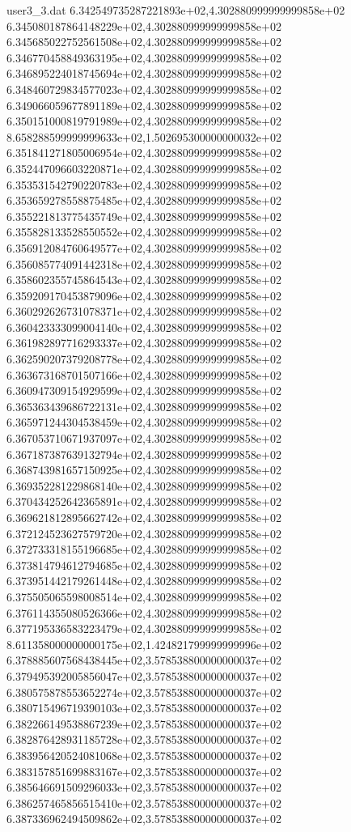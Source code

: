 \begin{filecontents}{user3_3.dat}
6.342549735287221893e+02,4.302880999999999858e+02
6.345080187864148229e+02,4.302880999999999858e+02
6.345685022752561508e+02,4.302880999999999858e+02
6.346770458849363195e+02,4.302880999999999858e+02
6.346895224018745694e+02,4.302880999999999858e+02
6.348460729834577023e+02,4.302880999999999858e+02
6.349066059677891189e+02,4.302880999999999858e+02
6.350151000819791989e+02,4.302880999999999858e+02
8.658288599999999633e+02,1.502695300000000032e+02
6.351841271805006954e+02,4.302880999999999858e+02
6.352447096603220871e+02,4.302880999999999858e+02
6.353531542790220783e+02,4.302880999999999858e+02
6.353659278558875485e+02,4.302880999999999858e+02
6.355221813775435749e+02,4.302880999999999858e+02
6.355828133528550552e+02,4.302880999999999858e+02
6.356912084760649577e+02,4.302880999999999858e+02
6.356085774091442318e+02,4.302880999999999858e+02
6.358602355745864543e+02,4.302880999999999858e+02
6.359209170453879096e+02,4.302880999999999858e+02
6.360292626731078371e+02,4.302880999999999858e+02
6.360423333099004140e+02,4.302880999999999858e+02
6.361982897716293337e+02,4.302880999999999858e+02
6.362590207379208778e+02,4.302880999999999858e+02
6.363673168701507166e+02,4.302880999999999858e+02
6.360947309154929599e+02,4.302880999999999858e+02
6.365363439686722131e+02,4.302880999999999858e+02
6.365971244304538459e+02,4.302880999999999858e+02
6.367053710671937097e+02,4.302880999999999858e+02
6.367187387639132794e+02,4.302880999999999858e+02
6.368743981657150925e+02,4.302880999999999858e+02
6.369352281229868140e+02,4.302880999999999858e+02
6.370434252642365891e+02,4.302880999999999858e+02
6.369621812895662742e+02,4.302880999999999858e+02
6.372124523627579720e+02,4.302880999999999858e+02
6.372733318155196685e+02,4.302880999999999858e+02
6.373814794612794685e+02,4.302880999999999858e+02
6.373951442179261448e+02,4.302880999999999858e+02
6.375505065598008514e+02,4.302880999999999858e+02
6.376114355080526366e+02,4.302880999999999858e+02
6.377195336583223479e+02,4.302880999999999858e+02
8.611358000000000175e+02,1.424821799999999996e+02
6.378885607568438445e+02,3.578538800000000037e+02
6.379495392005856047e+02,3.578538800000000037e+02
6.380575878553652274e+02,3.578538800000000037e+02
6.380715496719390103e+02,3.578538800000000037e+02
6.382266149538867239e+02,3.578538800000000037e+02
6.382876428931185728e+02,3.578538800000000037e+02
6.383956420524081068e+02,3.578538800000000037e+02
6.383157851699883167e+02,3.578538800000000037e+02
6.385646691509296033e+02,3.578538800000000037e+02
6.386257465856515410e+02,3.578538800000000037e+02
6.387336962494509862e+02,3.578538800000000037e+02

\end{filecontents}
